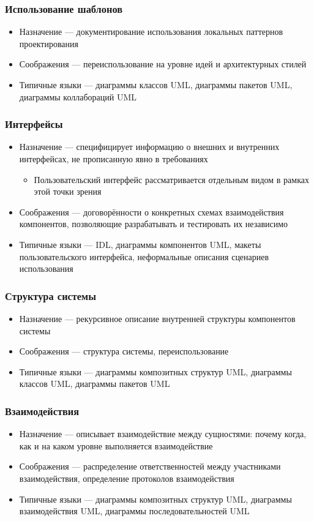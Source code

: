 \documentclass[xetex,mathserif,serif]{beamer}
\begin{document}
	\begin{frame}
		\frametitle{Использование шаблонов}
		\begin{itemize}
			\item Назначение --- документирование использования локальных паттернов проектирования
			\item Соображения --- переиспользование на уровне идей и архитектурных стилей
			\item Типичные языки --- диаграммы классов UML, диаграммы пакетов UML, диаграммы коллабораций UML
		\end{itemize}
	\end{frame}

	\begin{frame}
		\frametitle{Интерфейсы}
		\begin{itemize}
			\item Назначение --- специфицирует информацию о внешних и внутренних интерфейсах, не прописанную явно в требованиях
			\begin{itemize}
				\item Пользовательский интерфейс рассматривается отдельным видом в рамках этой точки зрения
			\end{itemize}
			\item Соображения --- договорённости о конкретных схемах взаимодействия компонентов, позволяющие разрабатывать и тестировать их независимо
			\item Типичные языки --- IDL, диаграммы компонентов UML, макеты пользовательского интерфейса, неформальные описания сценариев использования
		\end{itemize}
	\end{frame}

	\begin{frame}
		\frametitle{Структура системы}
		\begin{itemize}
			\item Назначение --- рекурсивное описание внутренней структуры компонентов системы
			\item Соображения --- структура системы, переиспользование
			\item Типичные языки --- диаграммы композитных структур UML, диаграммы классов UML, диаграммы пакетов UML
		\end{itemize}
	\end{frame}

	\begin{frame}
		\frametitle{Взаимодействия}
		\begin{itemize}
			\item Назначение --- описывает взаимодействие между сущностями: почему когда, как и на каком уровне выполняется взаимодействие
			\item Соображения --- распределение ответственностей между участниками взаимодействия, определение протоколов взаимодействия
			\item Типичные языки --- диаграммы композитных структур UML, диаграммы взаимодействия UML, диаграммы последовательностей UML
		\end{itemize}
	\end{frame}
\end{document}
